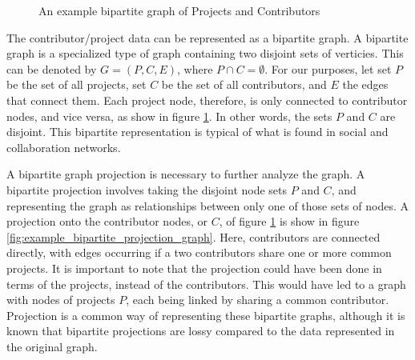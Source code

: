 \documentclass{proc}
\begin{document}
\begin{figure}
\centering
{}
\caption{An example bipartite graph of Projects and Contributors}
\label{fig:example_bipartite_graph}
\end{figure}

The contributor/project data can be represented as a bipartite graph. A bipartite graph is a specialized type of graph containing two disjoint sets of verticies. This can be denoted by ${G=(P,C,E)}$, where ${P \cap C = \emptyset}$. For our purposes, let set $P$ be the set of all projects, set $C$ be the set of all contributors, and $E$ the edges that connect them. Each project node, therefore, is only connected to contributor nodes, and vice versa, as show in figure \ref{fig:example_bipartite_graph}. In other words, the sets $P$ and $C$ are disjoint. This bipartite representation is typical of what is found in social and collaboration networks\cite{ramasco2004self}.  

A bipartite graph projection is necessary to further analyze the graph. A bipartite projection involves taking the disjoint node sets $P$ and $C$, and representing the graph as relationships between only one of those sets of nodes. A projection onto the contributor nodes, or $C$, of figure \ref{fig:example_bipartite_graph} is show in figure \ref{fig:example_bipartite_projection_graph}. Here, contributors are connected directly, with edges occurring if a two contributors share one or more common projects. It is important to note that the projection could have been done in terms of the projects, instead of the contributors. This would have led to a graph with nodes of projects $P$, each being linked by sharing a common contributor. Projection is a common way of representing these bipartite graphs\cite{newman2001scientific}, although it is known that bipartite projections are lossy compared to the data represented in the original graph\cite{zhou2007bipartite}.\\
\end{document}
